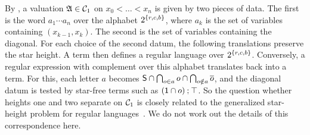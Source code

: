 \begin{remark}\label{remark: pathwidth one words}
  By , a valuation $\mathfrak{A} \in \mathcal{C}_{1}$ on $x_0 < \dots < x_n$ is given by two pieces of data.
  The first is the word $a_1 \cdots a_n$ over the alphabet $2^{\{r, c, b\}}$, where $a_k$ is the set of variables containing $(x_{k-1}, x_k)$.
  The second is the set of variables containing the diagonal.
  For each choice of the second datum, the following translations preserve the star height.
  A term then defines a regular language over $2^{\{r, c, b\}}$.
  Conversely, a regular expression with complement over this alphabet translates back into a term.
  For this, each letter $a$ becomes $\mathsf{S} \cap \bigcap_{o \in a} o \cap \bigcap_{o \notin a} \overline{o}$, and the diagonal datum is tested by star-free terms such as $(\mathsf{1} \cap o) \mathbin{;} \top$.
  So the question whether heights one and two separate on $\mathcal{C}_{1}$ is closely related to the generalized star-height problem for regular languages~\cite{pinResultsGeneralizedStarheight1992}.
  We do not work out the details of this correspondence here.
\end{remark}
